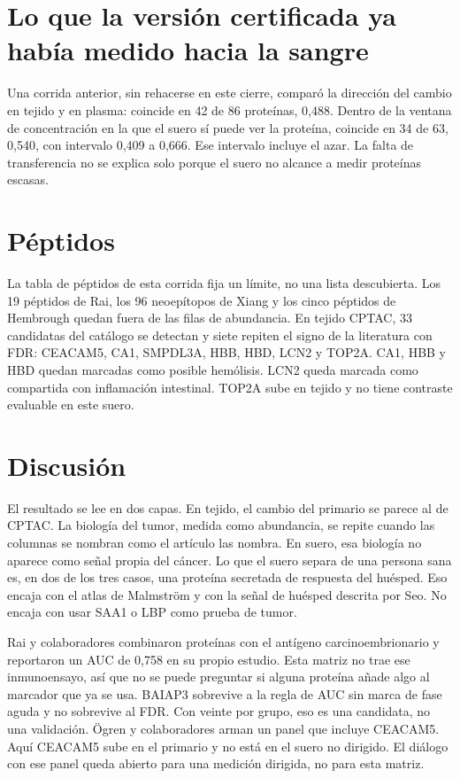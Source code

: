 \documentclass[12pt,oneside]{report}
\begin{document}
\section{Lo que la versión certificada ya había medido hacia la sangre}
Una corrida anterior, sin rehacerse en este cierre, comparó la dirección del cambio en tejido y en plasma: coincide en 42 de 86 proteínas, 0,488. Dentro de la ventana de concentración en la que el suero sí puede ver la proteína, coincide en 34 de 63, 0,540, con intervalo 0,409 a 0,666. Ese intervalo incluye el azar. La falta de transferencia no se explica solo porque el suero no alcance a medir proteínas escasas.

\section{Péptidos}
La tabla de péptidos de esta corrida fija un límite, no una lista descubierta. Los 19 péptidos de Rai, los 96 neoepítopos de Xiang y los cinco péptidos de Hembrough quedan fuera de las filas de abundancia. En tejido CPTAC, 33 candidatas del catálogo se detectan y siete repiten el signo de la literatura con FDR: CEACAM5, CA1, SMPDL3A, HBB, HBD, LCN2 y TOP2A. CA1, HBB y HBD quedan marcadas como posible hemólisis. LCN2 queda marcada como compartida con inflamación intestinal. TOP2A sube en tejido y no tiene contraste evaluable en este suero.

\section{Discusión}
El resultado se lee en dos capas. En tejido, el cambio del primario se parece al de CPTAC. La biología del tumor, medida como abundancia, se repite cuando las columnas se nombran como el artículo las nombra. En suero, esa biología no aparece como señal propia del cáncer. Lo que el suero separa de una persona sana es, en dos de los tres casos, una proteína secretada de respuesta del huésped. Eso encaja con el atlas de Malmström y con la señal de huésped descrita por Seo. No encaja con usar SAA1 o LBP como prueba de tumor.

Rai y colaboradores combinaron proteínas con el antígeno carcinoembrionario y reportaron un AUC de 0,758 en su propio estudio. Esta matriz no trae ese inmunoensayo, así que no se puede preguntar si alguna proteína añade algo al marcador que ya se usa. BAIAP3 sobrevive a la regla de AUC sin marca de fase aguda y no sobrevive al FDR. Con veinte por grupo, eso es una candidata, no una validación. Ögren y colaboradores arman un panel que incluye CEACAM5. Aquí CEACAM5 sube en el primario y no está en el suero no dirigido. El diálogo con ese panel queda abierto para una medición dirigida, no para esta matriz.
\end{document}
